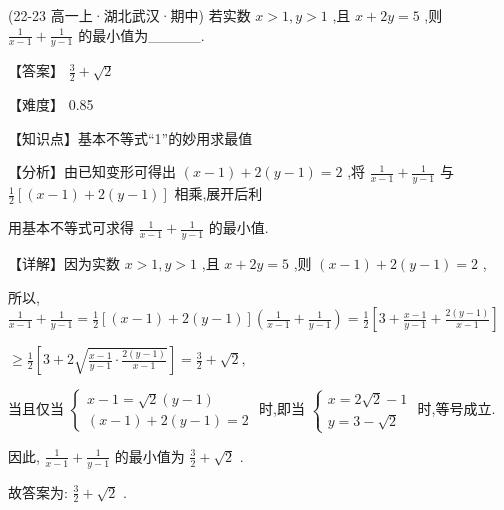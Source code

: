 \documentclass[11pt,a4paper]{article}
\begin{document}
\begin{hmwk} 
 (22-23 高一上·湖北武汉·期中) 若实数 \(\displaystyle x > 1,y > 1\) ,且 \(\displaystyle x + {2y} = 5\) ,则 \(\displaystyle \frac{1}{x - 1} + \frac{1}{y - 1}\) 的最小值为\_\_\_\_\_.

\begin{jiexi}
【答案】 \(\displaystyle \frac{3}{2} + \sqrt{2}\)

【难度】 0.85

【知识点】基本不等式“1”的妙用求最值

【分析】由已知变形可得出 \(\displaystyle \left( {x - 1}\right)  + 2\left( {y - 1}\right)  = 2\) ,将 \(\displaystyle \frac{1}{x - 1} + \frac{1}{y - 1}\) 与 \(\displaystyle \frac{1}{2}\left\lbrack  {\left( {x - 1}\right)  + 2\left( {y - 1}\right) }\right\rbrack\) 相乘,展开后利

用基本不等式可求得 \(\displaystyle \frac{1}{x - 1} + \frac{1}{y - 1}\) 的最小值.

【详解】因为实数 \(\displaystyle x > 1,y > 1\) ,且 \(\displaystyle x + {2y} = 5\) ,则 \(\displaystyle \left( {x - 1}\right)  + 2\left( {y - 1}\right)  = 2\) ,

所以, \(\displaystyle \frac{1}{x - 1} + \frac{1}{y - 1} = \frac{1}{2}\left\lbrack  {\left( {x - 1}\right)  + 2\left( {y - 1}\right) }\right\rbrack  \left( {\frac{1}{x - 1} + \frac{1}{y - 1}}\right)  = \frac{1}{2}\left\lbrack  {3 + \frac{x - 1}{y - 1} + \frac{2\left( {y - 1}\right) }{x - 1}}\right\rbrack\)

\(\displaystyle \geq  \frac{1}{2}\left\lbrack  {3 + 2\sqrt{\frac{x - 1}{y - 1} \cdot  \frac{2\left( {y - 1}\right) }{x - 1}}}\right\rbrack   = \frac{3}{2} + \sqrt{2},\)

当且仅当 \(\displaystyle \left\{  \begin{array}{l} x - 1 = \sqrt{2}\left( {y - 1}\right) \\  \left( {x - 1}\right)  + 2\left( {y - 1}\right)  = 2 \end{array}\right.\) 时,即当 \(\displaystyle \left\{  \begin{array}{l} x = 2\sqrt{2} - 1 \\  y = 3 - \sqrt{2} \end{array}\right.\) 时,等号成立.

因此, \(\displaystyle \frac{1}{x - 1} + \frac{1}{y - 1}\) 的最小值为 \(\displaystyle \frac{3}{2} + \sqrt{2}\) .

故答案为: \(\displaystyle \frac{3}{2} + \sqrt{2}\) .

\end{jiexi}
\end{hmwk}
\end{document}
